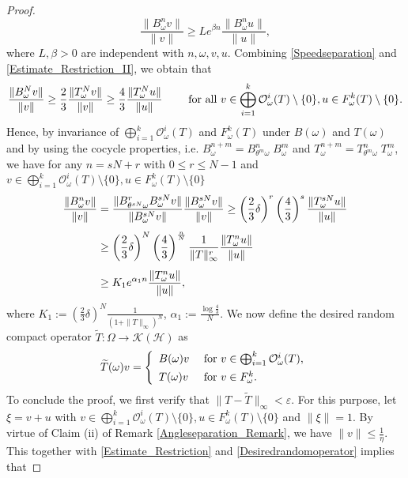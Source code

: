\documentclass[pdflatex,sn-mathphys-num]{sn-jnl}%
\theoremstyle{thmstyleone}%
\theoremstyle{thmstyletwo}%
\theoremstyle{thmstylethree}%
\newcommand{\cH}{\mathcal{H}}
\newcommand{\cK}{\mathcal{K}}
\newcommand{\cO}{\mathcal{O}}
\newcommand{\eps}{\varepsilon}
\numberwithin{equation}{section}
\begin{document}
\begin{proof}
\begin{equation}\label{Integralseparation_Density_Apply}
\frac{\|B^n_{\omega}v\|}{\|v\|}
\geq
L e^{\beta n}
\frac{\|B^n_{\omega}u\|}{\|u\|},
\end{equation}
where $L,\beta>0$ are independent with $n,\omega,v,u$. Combining \eqref{Speedseparation} and \eqref{Estimate_Restriction_II}, we obtain that 
\[
\frac{\|B^N_{\omega}v\|}{\|v\|}
\geq \frac{2}{3}\frac{\|T^N_{\omega}v\|}{\|v\|}
\geq 
\frac{4}{3}\frac{\|T^N_{\omega}u\|}{\|u\|}
\qquad \hbox{ for all } v\in \bigoplus_{i=1}^k \cO^i_{\omega}(T)\setminus\{0\}, u\in F^k_{\omega}(T)\setminus\{0\}.
\]
Hence, by invariance of $\bigoplus_{i=1}^k \cO^i_{\omega}(T)$ and $F^k_{\omega}(T)$ under $B(\omega)$ and $T(\omega)$ and by using the cocycle properties, i.e. $B^{n+m}_{\omega}=B^n_{\theta^m\omega}\; B^m_{\omega}$ and $T^{n+m}_{\omega}=T^n_{\theta^m\omega}\; T^m_{\omega}$, we have for any $n=sN+r$ with $0\leq r\leq N-1$ and $v\in \bigoplus_{i=1}^k \cO^i_{\omega}(T)\setminus\{0\}, u\in F^k_{\omega}(T)\setminus\{0\}$  
\begin{align}
    \frac{\|B^n_{\omega}v\|}{\|v\|}
& =
\frac{\|B^r_{\theta^{sN}\omega}B^{sN}_{\omega}v\|}{\|B^{sN}_{\omega}v\|}
\frac{\|B^{sN}_{\omega}v\|}{\|v\|}\notag  \geq 
\left(\frac{2}{3}\delta\right)^r \left(\frac{4}{3}\right)^s \frac{\|T^{sN}_{\omega}u\|}{\|u\|} \\[1ex]
& \geq 
\left(\frac{2}{3}\delta\right)^N \left(\frac{4}{3}\right)^{\frac{n}{N}}\frac{1}{\|T\|_{\infty}^r} \frac{\|T^{n}_{\omega}u\|}{\|u\|}\notag\\[1ex]
& \geq K_1 e^{\alpha_1 n} \frac{\|T^{n}_{\omega}u\|}{\|u\|},\label{Separation_Eq1}
\end{align}
where $K_1:=\left(\frac{2}{3}\delta\right)^N \frac{1}{(1+\|T\|_{\infty})^N}$, $\alpha_1:=\frac{\log\frac{4}{3}}{N}$. We now define the desired random compact operator $\widetilde T:\Omega\rightarrow \cK(\cH)$ as 
\begin{equation}\label{Desiredrandomoperator}
\widetilde T(\omega)v=
\left\{
\begin{array}{ll}
B(\omega) v    &  \hbox{ for } v\in \bigoplus_{i=1}^k \cO^i_{\omega}(T),\\[1ex]
T(\omega) v     &  \hbox{ for } v\in F^k_{\omega}. 
\end{array}
\right.
\end{equation}
To conclude the proof, we first verify that $\|T-\widetilde T\|_{\infty}<\eps$. For this purpose, let $\xi=v+u$ with $v\in \bigoplus_{i=1}^{k} \mathcal O^i_{\omega}(T)\setminus\{0\}, u\in F^{k}_{\omega}(T)\setminus\{0\}$ and $\|\xi\|=1$. By virtue of Claim (ii) of Remark \ref{Angleseparation_Remark}, we have $\|v\|\leq \frac{1}{\eta}$. This together with  \eqref{Estimate_Restriction} and \eqref{Desiredrandomoperator} implies that 

\end{proof}
\end{document}
